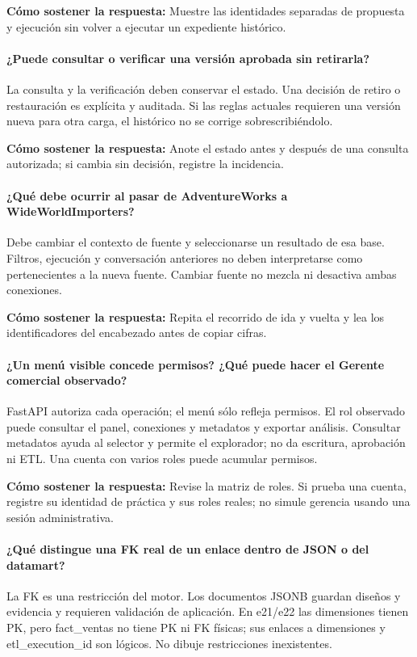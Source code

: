 \textbf{Cómo sostener la respuesta:} Muestre las identidades separadas de propuesta y ejecución sin volver a ejecutar un expediente histórico.

\paragraph{¿Puede consultar o verificar una versión aprobada sin retirarla?} La consulta y la verificación deben conservar el estado. Una decisión de retiro o restauración es explícita y auditada. Si las reglas actuales requieren una versión nueva para otra carga, el histórico no se corrige sobrescribiéndolo.

\textbf{Cómo sostener la respuesta:} Anote el estado antes y después de una consulta autorizada; si cambia sin decisión, registre la incidencia.

\paragraph{¿Qué debe ocurrir al pasar de AdventureWorks a WideWorldImporters?} Debe cambiar el contexto de fuente y seleccionarse un resultado de esa base. Filtros, ejecución y conversación anteriores no deben interpretarse como pertenecientes a la nueva fuente. Cambiar fuente no mezcla ni desactiva ambas conexiones.

\textbf{Cómo sostener la respuesta:} Repita el recorrido de ida y vuelta y lea los identificadores del encabezado antes de copiar cifras.

\paragraph{¿Un menú visible concede permisos? ¿Qué puede hacer el Gerente comercial observado?} FastAPI autoriza cada operación; el menú sólo refleja permisos. El rol observado puede consultar el panel, conexiones y metadatos y exportar análisis. Consultar metadatos ayuda al selector y permite el explorador; no da escritura, aprobación ni ETL. Una cuenta con varios roles puede acumular permisos.

\textbf{Cómo sostener la respuesta:} Revise la matriz de roles. Si prueba una cuenta, registre su identidad de práctica y sus roles reales; no simule gerencia usando una sesión administrativa.

\paragraph{¿Qué distingue una FK real de un enlace dentro de JSON o del datamart?} La FK es una restricción del motor. Los documentos JSONB guardan diseños y evidencia y requieren validación de aplicación. En e21/e22 las dimensiones tienen PK, pero fact\_\allowbreak{}ventas no tiene PK ni FK físicas; sus enlaces a dimensiones y etl\_\allowbreak{}execution\_\allowbreak{}id son lógicos. No dibuje restricciones inexistentes.

